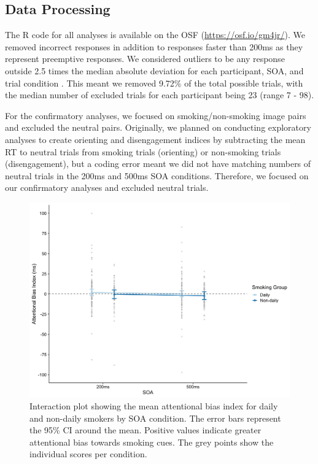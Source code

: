 \documentclass[empirical, authordate, issue]{jote-new-article}
\begin{document}
\subsection{Data Processing}

The R code for all analyses is available on the OSF (\url{https://osf.io/gm4jr/}). We removed incorrect responses in addition to responses faster than 200ms as they represent preemptive responses. We considered outliers to be any response outside 2.5 times the median absolute deviation for each participant, SOA, and trial condition \parencite{Leys2013}. This meant we removed 9.72\% of the total possible trials, with the median number of excluded trials for each participant being 23 (range 7 - 98).

For the confirmatory analyses, we focused on smoking/non-smoking image pairs and excluded the neutral pairs. Originally, we planned on conducting exploratory analyses to create orienting and disengagement indices \parencite{Salemink2007} by subtracting the mean RT to neutral trials from smoking trials (orienting) or non-smoking trials (disengagement), but a coding error meant we did not have matching numbers of neutral trials in the 200ms and 500ms SOA conditions. Therefore, we focused on our confirmatory analyses and excluded neutral trials.

\begin{figure}[t]

  \begin{fullwidth}
    \includegraphics[width=\linewidth]{media/image3.jpeg}
    \caption{Interaction plot showing the mean attentional bias index for daily and non-daily smokers by SOA condition. The error bars represent the 95\% CI around the mean. Positive values indicate greater attentional bias towards smoking cues. The grey points show the individual scores per condition.}
    \label{fig:3}

  \end{fullwidth}


\end{figure}
\end{document}
